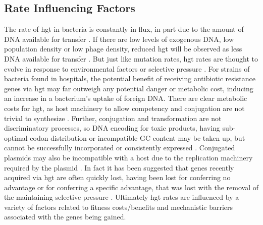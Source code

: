 \subsection*{Rate Influencing Factors}
The rate of \ac{hgt} in bacteria is constantly in flux, in part due to the amount of DNA available for transfer \citep{trendbs}.
If there are low levels of exogenous DNA, low population density or low phage density, reduced \ac{hgt} will be observed as less DNA available for transfer \citep{lgt}.
But just like mutation rates, \ac{hgt} rates are thought to evolve in response to environmental factors or selective pressure \citep{mtrate,hgtrate}.
For strains of bacteria found in hospitals, the potential benefit of receiving antibiotic resistance genes via \ac{hgt} may far outweigh any potential danger or metabolic cost, inducing an increase in a bacterium's uptake of foreign DNA. \citep{hospital}
There are clear metabolic costs for \ac{hgt}, as host machinery to allow competency and conjugation are not trivial to synthesize \citep{hgtcost}.
Further, conjugation and transformation are not discriminatory processes, so DNA encoding for toxic products, having sub-optimal codon distribution or incompatible GC content may be taken up, but cannot be successfully incorporated or consistently expressed \citep{hgtcost}.
Conjugated plasmids may also be incompatible with a host due to the replication machinery required by the plasmid \citep{plasincom}.
In fact it has been suggested that genes recently acquired via \ac{hgt} are often quickly lost, having been lost for conferring no advantage or for conferring a specific advantage, that was lost with the removal of the maintaining selective pressure \citep{fastlane}.
Ultimately \ac{hgt} rates are influenced by a variety of factors related to fitness costs/benefits and mechanistic barriers associated with the genes being gained.
